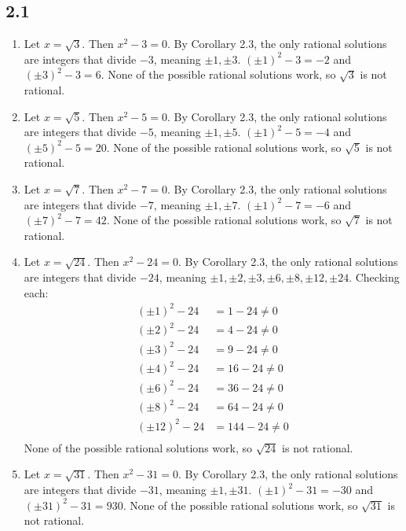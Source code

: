 \documentclass[12pt,titlepage]{extarticle}
\begin{document}
\subsection*{2.1}
\begin{enumerate}
	\item Let $x = \sqrt{3}$. Then $x^2 - 3 = 0$. By Corollary 2.3, the only rational solutions are integers that divide $-3$, meaning $\pm 1, \pm 3$. $(\pm 1)^2 - 3 = -2$ and $(\pm 3)^2 - 3 = 6$. None of the possible rational solutions work, so $\sqrt{3}$ is not rational.
	\item Let $x = \sqrt{5}$. Then $x^2 - 5 = 0$. By Corollary 2.3, the only rational solutions are integers that divide $-5$, meaning $\pm 1, \pm 5$. $(\pm 1)^2 - 5 = -4$ and $(\pm 5)^2 - 5 = 20$. None of the possible rational solutions work, so $\sqrt{5}$ is not rational.
	\item Let $x = \sqrt{7}$. Then $x^2 - 7 = 0$. By Corollary 2.3, the only rational solutions are integers that divide $-7$, meaning $\pm 1, \pm 7$. $(\pm 1)^2 - 7 = -6$ and $(\pm 7)^2 - 7 = 42$. None of the possible rational solutions work, so $\sqrt{7}$ is not rational.
	\item Let $x = \sqrt{24}$. Then $x^2 - 24 = 0$. By Corollary 2.3, the only rational solutions are integers that divide $-24$, meaning $\pm 1, \pm 2, \pm 3, \pm 6, \pm 8, \pm 12, \pm 24$. Checking each:
		\begin{align*}
			(\pm 1)^2 - 24 &= 1 - 24 \neq 0\\
			(\pm 2)^2 - 24 &= 4 - 24 \neq 0\\
			(\pm 3)^2 - 24 &= 9 -24 \neq 0 \\
			(\pm 4)^2 - 24 &= 16 - 24 \neq 0 \\
			(\pm 6)^2 - 24 &= 36 - 24 \neq 0 \\
			(\pm 8)^2 - 24 &= 64 - 24 \neq 0 \\
			(\pm 12)^2 - 24 &= 144 - 24 \neq 0 \\
		\end{align*}
		None of the possible rational solutions work, so $\sqrt{24}$ is not rational.
	\item Let $x = \sqrt{31}$. Then $x^2 - 31 = 0$. By Corollary 2.3, the only rational solutions are integers that divide $-31$, meaning $\pm 1, \pm 31$. $(\pm 1)^2 - 31 = -30$ and $(\pm 31)^2 - 31 = 930$. None of the possible rational solutions work, so $\sqrt{31}$ is not rational.
\end{enumerate}
\end{document}

